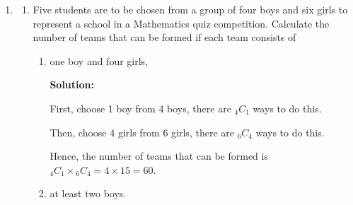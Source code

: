 \documentclass{report}
\newcommand{\sol}{\textbf{Solution:}}
\newcommand\comb[2][^n]{{}_{#1}C_{#2}}
\begin{document}
\begin{enumerate}[leftmargin=*]
\begin{enumerate}
                    Given that the area of the shaded region $P=$ area of the shaded region $Q$,
                    find the value of $h$.

                    \sol{}
                    \begin{align*}
                        y^2                             & = \dfrac{16}{x}                   \\
                        x                               & = \dfrac{16}{y^2}                 \\
                        \int_2^h \dfrac{16}{y^2} d y    & = \int_h^8 \dfrac{16}{y^2} d y    \\
                        \left[-\dfrac{16}{y}\right]_2^h & = \left[-\dfrac{16}{y}\right]_h^8 \\
                        -\dfrac{16}{h} + 8              & = -2 + \dfrac{16}{h}              \\
                        10                              & = \dfrac{32}{h}                   \\
                        h                               & = 3.2
                    \end{align*}
          \end{enumerate}

    \item \begin{enumerate}
              \item Five students are to be chosen from a group of four boys and six girls to
                    represent a school in a Mathematics quiz competition. Calculate the number of
                    teams that can be formed if each team consists of
                    \begin{enumerate}
                        \item one boy and four girls,

                              \sol{}

                              First, choose 1 boy from 4 boys, there are $\comb[4]{1}$ ways to do this.

                              Then, choose 4 girls from 6 girls, there are $\comb[6]{4}$ ways to do this.

                              Hence, the number of teams that can be formed is $\comb[4]{1} \times
                                  \comb[6]{4} = 4 \times 15 = 60$.

                        \item at least two boys.


\end{enumerate}
\end{enumerate}
\end{enumerate}
\end{document}
